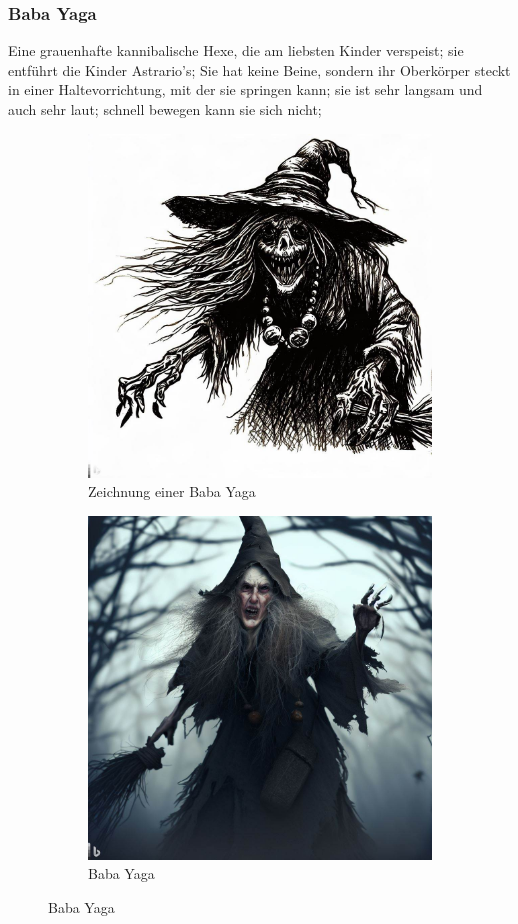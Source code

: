 \documentclass[11pt, twoside]{article}
\begin{document}
\subsubsection{Baba Yaga\label{baba}}
\label{sec:org968e80e}
Eine grauenhafte kannibalische Hexe, die am liebsten Kinder verspeist; sie entführt die Kinder Astrario’s; Sie hat keine Beine, sondern ihr Oberkörper steckt in einer Haltevorrichtung, mit der sie springen kann; sie ist sehr langsam und auch sehr laut; schnell bewegen kann sie sich nicht;
\begin{figure}[H]
\centering
\caption{Baba Yaga}
\label{fig:baba}
  \begin{subfigure}{0.5\textwidth}
    \centering
    \includegraphics[width=0.8\linewidth]{baba1.jpeg}
    \caption{Zeichnung einer Baba Yaga}
  \end{subfigure}%
  \begin{subfigure}{0.5\textwidth}
    \centering
    \includegraphics[width=0.8\linewidth]{baba2.jpeg}
    \caption{Baba Yaga}
  \end{subfigure}
\end{figure}
\end{document}
